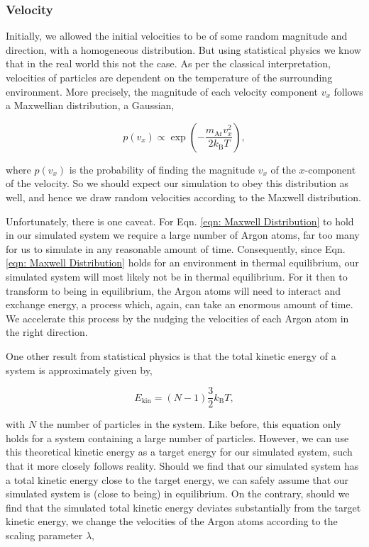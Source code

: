 \documentclass{IAYCPro}
\begin{document}
\raggedbottom
\newpage

\subsubsection{Velocity}

Initially, we allowed the initial velocities to be of some random magnitude and direction, with a homogeneous distribution. But using statistical physics we know that in the real world this not the case. As per the classical interpretation, velocities of particles are dependent on the temperature of the surrounding environment. More precisely, the magnitude of each velocity component $v_x$ follows a Maxwellian distribution, a Gaussian,

\begin{equation}
    p(v_x) \propto \exp\left(-\frac{m_\mathrm{Ar}v_x^2}{2k_\mathrm{B}T}\right)
    \label{eqn: Maxwell Distribution},
\end{equation}

where $p(v_x)$ is the probability of finding the magnitude $v_x$ of the $x$-component of the velocity. So we should expect our simulation to obey this distribution as well, and hence we draw random velocities according to the Maxwell distribution.

Unfortunately, there is one caveat. For Eqn. \ref{eqn: Maxwell Distribution} to hold in our simulated system we require a large number of Argon atoms, far too many for us to simulate in any reasonable amount of time. Consequently, since Eqn. \ref{eqn: Maxwell Distribution} holds for an environment in thermal equilibrium, our simulated system will most likely not be in thermal equilibrium. For it then to transform to being in equilibrium, the Argon atoms will need to interact and exchange energy, a process which, again, can take an enormous amount of time. We accelerate this process by the nudging the velocities of each Argon atom in the right direction.

One other result from statistical physics is that the total kinetic energy of a system is approximately given by,

\begin{equation}
    E_\mathrm{kin} = (N-1)\frac{3}{2}k_\mathrm{B}T,
    \label{eqn: Target Kin-E}
\end{equation}

with $N$ the number of particles in the system. Like before, this equation only holds for a system containing a large number of particles. However, we can use this theoretical kinetic energy as a target energy for our simulated system, such that it more closely follows reality. Should we find that our simulated system has a total kinetic energy close to the target energy, we can safely assume that our simulated system is (close to being) in equilibrium. On the contrary, should we find that the simulated total kinetic energy deviates substantially from the target kinetic energy, we change the velocities of the Argon atoms according to the scaling parameter $\lambda$,
\end{document}
